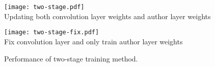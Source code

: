 \begin{figure}[tbp] %
   \centering
\begin{minipage}{0.5\linewidth}\centering
   \texttt{[image: two-stage.pdf]} 
   \\{\footnotesize Updating both convolution layer weights and author layer weights   }
\end{minipage}
\begin{minipage}{0.49\linewidth}\centering
   \texttt{[image: two-stage-fix.pdf]} 
   \\{\footnotesize Fix convolution layer and only train author layer weights   }
\end{minipage}
\caption{Performance of two-stage training method.}
\label{Fig:TwoStage}
\end{figure}